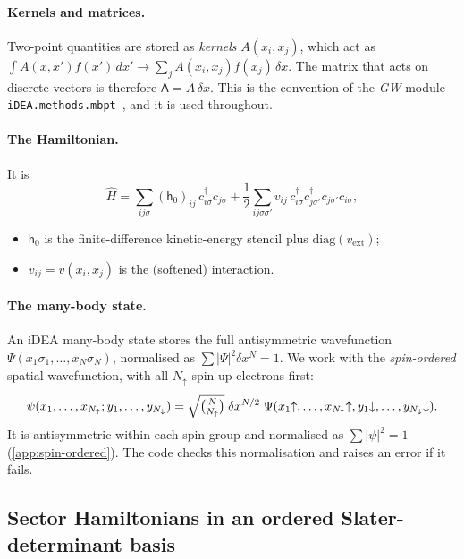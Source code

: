 \documentclass[11pt,a4paper]{article}
\newcommand{\GW}{\textit{GW}}
\newcommand{\iDEA}{iDEA}
\newcommand{\code}[1]{\texttt{#1}}
\newcommand{\dx}{\delta x}
\newcommand{\mat}[1]{\mathsf{#1}}
\newcommand{\up}{{\uparrow}}
\newcommand{\dn}{{\downarrow}}
\begin{document}
\paragraph{Kernels and matrices.} Two-point quantities are stored as \emph{kernels} $A(x_i,x_j)$, which act as $\int A(x,x')f(x')\,dx' \to \sum_j A(x_i,x_j)f(x_j)\,\dx$. The matrix that acts on discrete vectors is therefore $\mat A = A\,\dx$. This is the convention of the \GW{} module \code{iDEA.methods.mbpt}~\cite{rojas1995,rieger1999}, and it is used throughout.

\paragraph{The Hamiltonian.} It is
\begin{equation}
\hat H = \sum_{ij\sigma}(\mat h_0)_{ij}\,c^\dagger_{i\sigma}c_{j\sigma} + \frac12\sum_{ij\sigma\sigma'} v_{ij}\,c^\dagger_{i\sigma}c^\dagger_{j\sigma'}c_{j\sigma'}c_{i\sigma},
\end{equation}
\begin{itemize}
\item $\mat h_0$ is the finite-difference kinetic-energy stencil plus $\mathrm{diag}(v_\text{ext})$;
\item $v_{ij} = v(x_i,x_j)$ is the (softened) interaction.
\end{itemize}

\paragraph{The many-body state.} An \iDEA{} many-body state stores the full antisymmetric wavefunction $\Psi(x_1\sigma_1,\dots,x_N\sigma_N)$, normalised as $\sum|\Psi|^2\dx^N=1$. We work with the \emph{spin-ordered} spatial wavefunction, with all $N_\up$ spin-up electrons first:
\begin{equation}
\psi(x_1,\dots,x_{N_\up};y_1,\dots,y_{N_\dn}) = \sqrt{\tbinom{N}{N_\up}}\;\dx^{N/2}\;\Psi(x_1{\up},\dots,x_{N_\up}{\up},y_1{\dn},\dots,y_{N_\dn}{\dn}).
\label{eq:spin-ordered}
\end{equation}
It is antisymmetric within each spin group and normalised as $\sum|\psi|^2=1$ (\cref{app:spin-ordered}). The code checks this normalisation and raises an error if it fails.

\subsection{Sector Hamiltonians in an ordered Slater-determinant basis}
\label{sec:sectors}
\end{document}
